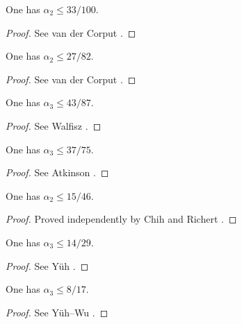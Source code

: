 \begin{lemma}\label{vdc-alpha-1}
One has $\alpha_2 \le 33/100$.
\end{lemma}
\begin{proof}
See van der Corput \cite{van_der_corput_verscharfung_1922}.
\end{proof}


\begin{lemma}\label{vdc-alpha-2}
One has $\alpha_2 \le 27/82$.
\end{lemma}
\begin{proof}
See van der Corput \cite{van_der_corput_zum_1928}.
\end{proof}

\begin{lemma}\label{walfisz-alpha-3}
One has $\alpha_3 \le 43/87$.
\end{lemma}
\begin{proof}
See Walfisz \cite{walfisz_uber_1926}.
\end{proof}

\begin{lemma}\label{atkinson-alpha-3}
One has $\alpha_3 \le 37/75$.
\end{lemma}
\begin{proof}
See Atkinson \cite{atkinson_divisor_1941}.
\end{proof}


\begin{lemma}\label{richert-alpha-2}
One has $\alpha_2 \le 15/46$.
\end{lemma}
\begin{proof}
Proved independently by Chih \cite{chih_on_1950} and Richert \cite{richert_verschrfung_1953}.
\end{proof}

\begin{lemma}\label{yuh-alpha-3}
One has $\alpha_3 \le 14/29$.
\end{lemma}
\begin{proof}
See Y\"{u}h \cite{yuh_divisor_1958}.
\end{proof}

\begin{lemma}\label{yuh-wu-alpha-3}
One has $\alpha_3 \le 8/17$.
\end{lemma}
\begin{proof}
See Y\"{u}h--Wu \cite{yuh_wu_divisor_1962}.
\end{proof}

